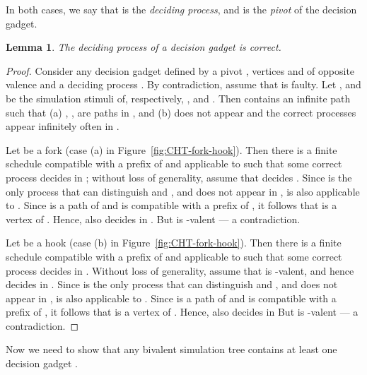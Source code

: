 \documentclass[11pt]{article}
\newtheorem{lemma}{Lemma}
\begin{document}
In both cases, we say that  is the \emph{deciding process}, and
	 is the \emph{pivot} of the decision gadget.



\begin{lemma}
\label{lemma:cht-deciding}
The deciding process of a decision gadget is correct.
\end{lemma}
\begin{proof}
Consider any decision gadget  defined by a pivot ,
	vertices  and  of opposite
	valence and a deciding process .
By contradiction, assume that  is faulty.
Let ,  and  be the simulation stimuli of, respectively,
	,  and .
Then  contains an infinite path  such that
	(a) , , 
	are paths in , and
	(b)  does not appear
	and the correct processes appear infinitely often in .

Let  be a fork (case (a) in Figure~\ref{fig:CHT-fork-hook}).
Then there is a finite schedule  compatible with a prefix of  and
	applicable to  such that some correct process
	 decides in ;
	without loss of generality, assume that  decides .
Since  is the only process that can distinguish  and ,
	and  does not appear in ,
	 is also applicable to .
Since  is a path of  and  is compatible with a prefix of ,
	it follows that   is a vertex of .
Hence,  also decides  in .
But  is -valent --- a contradiction.

Let  be a hook (case (b) in Figure~\ref{fig:CHT-fork-hook}).
Then there is a finite schedule  compatible with a prefix of  and
	applicable to  such that some correct process
	 decides in .
Without loss of generality, assume that  is -valent, and hence  decides 
	in  .
Since  is the only process that can distinguish  and ,
	and  does not appear in ,
	 is also applicable to .
Since  is a path of  and  is compatible with a prefix of ,
	it follows that   is a vertex of .
Hence,  also decides  in 
But  is -valent --- a contradiction.
\end{proof}

\noindent
Now we need to show that any bivalent simulation tree  contains at
	least one decision gadget .
\end{document}
